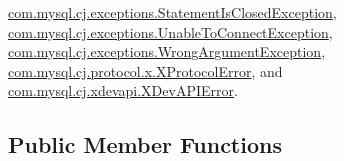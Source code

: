 \mbox{\hyperlink{classcom_1_1mysql_1_1cj_1_1exceptions_1_1_statement_is_closed_exception}{com.\+mysql.\+cj.\+exceptions.\+Statement\+Is\+Closed\+Exception}}, \mbox{\hyperlink{classcom_1_1mysql_1_1cj_1_1exceptions_1_1_unable_to_connect_exception}{com.\+mysql.\+cj.\+exceptions.\+Unable\+To\+Connect\+Exception}}, \mbox{\hyperlink{classcom_1_1mysql_1_1cj_1_1exceptions_1_1_wrong_argument_exception}{com.\+mysql.\+cj.\+exceptions.\+Wrong\+Argument\+Exception}}, \mbox{\hyperlink{classcom_1_1mysql_1_1cj_1_1protocol_1_1x_1_1_x_protocol_error}{com.\+mysql.\+cj.\+protocol.\+x.\+X\+Protocol\+Error}}, and \mbox{\hyperlink{classcom_1_1mysql_1_1cj_1_1xdevapi_1_1_x_dev_a_p_i_error}{com.\+mysql.\+cj.\+xdevapi.\+X\+Dev\+A\+P\+I\+Error}}.

\subsection*{Public Member Functions}
